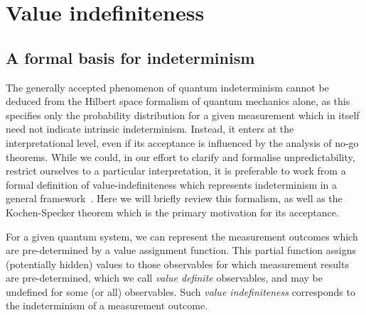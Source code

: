 \documentclass[%
 superscriptaddress,
 preprint,
 showpacs,
 showkeys,
 preprintnumbers,
  amsmath,amssymb,
  aps,
 pra,
  longbibliography,
  floatfix,
 ]{revtex4-1}
\theoremstyle{definition}
\begin{document}
\section{Value indefiniteness}

\subsection{A formal basis for indeterminism}

The generally accepted phenomenon of quantum indeterminism cannot be deduced from the Hilbert space formalism of quantum mechanics alone, as this specifies only the probability distribution for a given measurement which in itself need not indicate intrinsic indeterminism.
Instead, it enters at the interpretational level, even if its acceptance is influenced by the analysis of no-go theorems.
While we could, in our effort to clarify and formalise unpredictability, restrict ourselves to a particular interpretation, it is preferable to work from a formal definition of value-indefiniteness which represents indeterminism in a general framework~\cite{2012-incomput-proofsCJ}.
Here we will briefly review this formalism, as well as the Kochen-Specker theorem which is the primary motivation for its acceptance.



For a given quantum system, we can represent the measurement outcomes which are pre-determined by a value assignment function.
This partial function assigns (potentially hidden) values to those observables for which measurement results are pre-determined, which we call \emph{value definite} observables, and may be undefined for some (or all) observables.
Such \emph{value indefiniteness} corresponds to the indeterminism of a measurement outcome.

\end{document}
